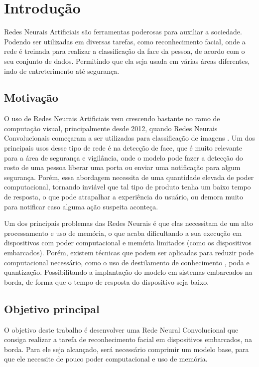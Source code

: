 \chapter{Introdução}

Redes Neurais Artificiais são ferramentas poderosas para auxiliar a sociedade.
Podendo ser utilizadas em diversas tarefas, como reconhecimento facial, onde a rede é treinada para realizar a
classificação da face da pessoa, de acordo com o seu conjunto de dados.
Permitindo que ela seja usada em várias áreas diferentes, indo de entreterimento até segurança.


\section{Motivação}
O uso de Redes Neurais Artificiais vem crescendo bastante no ramo de computação visual, principalmente desde 2012,
quando Redes Neurais Convolucionais começaram a ser utilizadas para classificação de imagens \cite{alexnet}.
Um dos principais usos desse tipo de rede é na detecção de face, que é muito relevante para a área de segurança e
vigilância, onde o modelo pode fazer a detecção do rosto de uma pessoa liberar uma porta ou enviar uma notificação
para algum segurança. Porém, essa abordagem necessita de uma quantidade elevada de poder computacional, tornando
inviável que tal tipo de produto tenha um baixo tempo de resposta, o que pode atrapalhar a experiência do usuário, ou
demora muito para notificar caso alguma ação suspeita aconteça.

Um dos principais problemas das Redes Neurais é que elas necessitam de um alto processamento e uso de memória, o que
acaba dificultando a sua execução em dispositivos com poder computacional e memória limitados (como os dispositivos
embarcados).
Porém, existem técnicas que podem ser aplicadas para reduzir pode computacional necessário, como o uso de destilamento
de conhecimento \cite{hinton2015distilling}, poda e quantização.
Possibilitando a implantação do modelo em sistemas embarcados na borda, de forma que o tempo de resposta do dispositivo
seja baixo.

\section{Objetivo principal}

O objetivo deste trabalho é desenvolver uma Rede Neural Convolucional que consiga realizar a tarefa de reconhecimento
facial em dispositivos embarcados, na borda.
Para ele seja alcançado, será necessário comprimir um modelo base, para que ele necessite de pouco poder computacional
e uso de memória.

